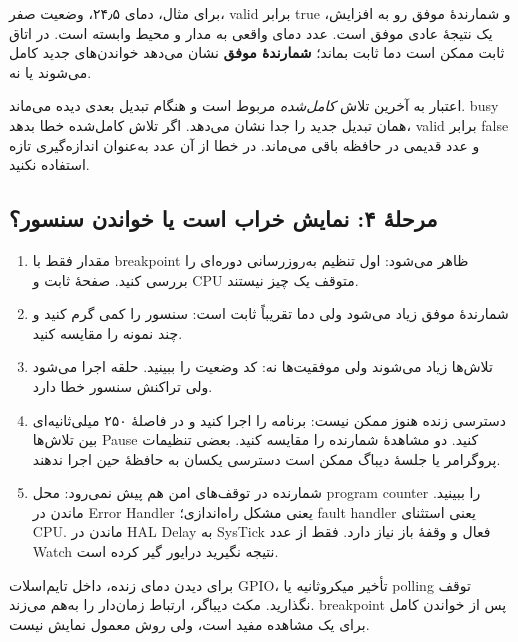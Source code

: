 برای مثال، دمای ۲۴٫۵، وضعیت صفر، valid برابر true و شمارندهٔ موفق رو به افزایش، یک نتیجۀ عادی موفق است. عدد دمای واقعی به مدار و محیط وابسته است. در اتاق ثابت ممکن است دما ثابت بماند؛
\textbf{شمارندهٔ موفق}
نشان می‌دهد خواندن‌های جدید کامل می‌شوند یا نه.

اعتبار به آخرین تلاش
\emph{کامل‌شده}
مربوط است و هنگام تبدیل بعدی دیده می‌ماند. busy همان تبدیل جدید را جدا نشان می‌دهد. اگر تلاش کامل‌شده خطا بدهد، valid برابر false و عدد قدیمی در حافظه باقی می‌ماند. در خطا از آن عدد به‌عنوان اندازه‌گیری تازه استفاده نکنید.


\subsection{مرحلهٔ ۴: نمایش خراب است یا خواندن سنسور؟}
\begin{enumerate}
\item مقدار فقط با breakpoint ظاهر می‌شود: اول تنظیم به‌روزرسانی دوره‌ای را بررسی کنید. صفحهٔ ثابت و CPU متوقف یک چیز نیستند.
\item شمارندهٔ موفق زیاد می‌شود ولی دما تقریباً ثابت است: سنسور را کمی گرم کنید و چند نمونه را مقایسه کنید.
\item تلاش‌ها زیاد می‌شوند ولی موفقیت‌ها نه: کد وضعیت را ببینید. حلقه اجرا می‌شود ولی تراکنش سنسور خطا دارد.
\item دسترسی زنده هنوز ممکن نیست: برنامه را اجرا کنید و در فاصلهٔ ۲۵۰ میلی‌ثانیه‌ای بین تلاش‌ها Pause کنید. دو مشاهدهٔ شمارنده را مقایسه کنید. بعضی تنظیمات پروگرامر یا جلسۀ دیباگ ممکن است دسترسی یکسان به حافظهٔ حین اجرا ندهند.
\item شمارنده در توقف‌های امن هم پیش نمی‌رود: محل program counter را ببینید. ماندن در Error Handler یعنی مشکل راه‌اندازی؛ fault handler یعنی استثنای CPU. ماندن در HAL Delay به SysTick فعال و وقفهٔ باز نیاز دارد. فقط از عدد Watch نتیجه نگیرید درایور گیر کرده است.
\end{enumerate}
برای دیدن دمای زنده، داخل تایم‌اسلات GPIO، تأخیر میکروثانیه یا polling توقف نگذارید. مکث دیباگر، ارتباط زمان‌دار را به‌هم می‌زند. breakpoint پس از خواندن کامل برای یک مشاهده مفید است، ولی روش معمول نمایش نیست.

